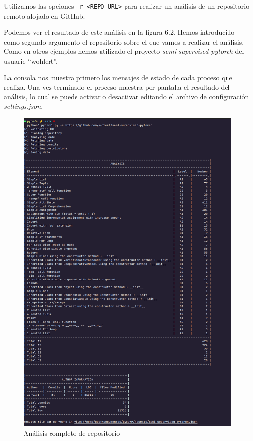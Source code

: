 \documentclass[a4paper, 12pt]{book}
\begin{document}
Utilizamos las opciones \texttt{-r <REPO\_URL>} para realizar un análisis de un repositorio remoto alojado en GitHub. 

Podemos ver el resultado de este análisis en la figura 6.2. Hemos introducido como segundo argumento el repositorio sobre el que vamos a realizar el análisis. Como en otros ejemplos hemos utilizado el proyecto \textit{semi-supervised-pytorch} del usuario ``wohlert''.

La consola nos muestra primero los mensajes de estado de cada proceso que realiza. Una vez terminado el proceso muestra por pantalla el resultado del análisis, lo cual se puede activar o desactivar editando el archivo de configuración \textit{settings.json}.
\newpage
\vspace{1em}

\begin{figure} [H]
    \centering
    \includegraphics[height=\textheight, keepaspectratio]{img/results/backend_exe_r.png}
    \caption{Análisis completo de repositorio}
    \label{fig:analysis_repo}
\end{figure}
\end{document}
